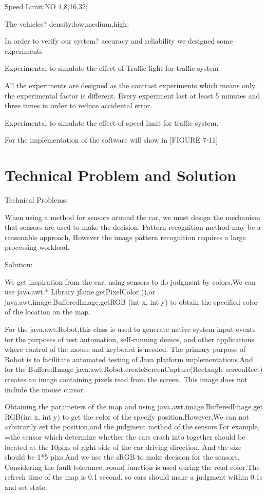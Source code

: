 \documentclass[12pt]{amsart}
\begin{document}
Speed Limit:NO 4,8,16,32;

The vehicles? density:low,medium,high;

In order to verify our system? accuracy and reliability we designed some experiments

Experimental to simulate the effect of Traffic light for traffic system

All the experiments are designed as the contrast experiments which means only the experimental factor is different. Every experiment last at least 5 minutes and three times in order to reduce accidental error.

Experimental to simulate the effect of speed limit for traffic system.

For the implementation of the software will show in [FIGURE 7-11]

\section{Technical Problem and Solution}

Technical Problems:

When using a method for sensors around the car, we must design the mechanism that sensors are used to make the decision. Pattern recognition method may be a reasonable approach, However the image pattern recognition requires a large processing workload.

Solution:

We get inspiration from the car, using sensors to do judgment by colors.We can use java.awt.* Library jfame.getPixelColor (),or java.awt.image.BufferedImage.getRGB (int x, int y) to obtain the specified color of the location on the map.

For the java.awt.Robot,this class is used to generate native system input events for the purposes of test automation, self-running demos, and other applications where control of the mouse and keyboard is needed. The primary purpose of Robot is to facilitate automated testing of Java platform implementations.And for the BufferedImage java.awt.Robot.createScreenCapture(Rectangle screenRect) creates an image containing pixels read from the screen. This image does not include the mouse cursor.

Obtaining the parameters of the map and using java.awt.image.BufferedImage.get\\RGB(int x, int y) to get the color of the specify position.However,We can not arbitrarily set the position,and the judgment method of the sensors.For example, =the sensor which determine whether the cars crash into together should be located at the 10pixs of right side of the car driving direction. And the size should be 1*5 pixs.And we use the sRGB to make decision for the sensors. Considering the fault tolerance, round function is used during the read color.The refresh time of the map is 0.1 second, so cars should make a judgment within 0.1s and set state.
\end{document}
